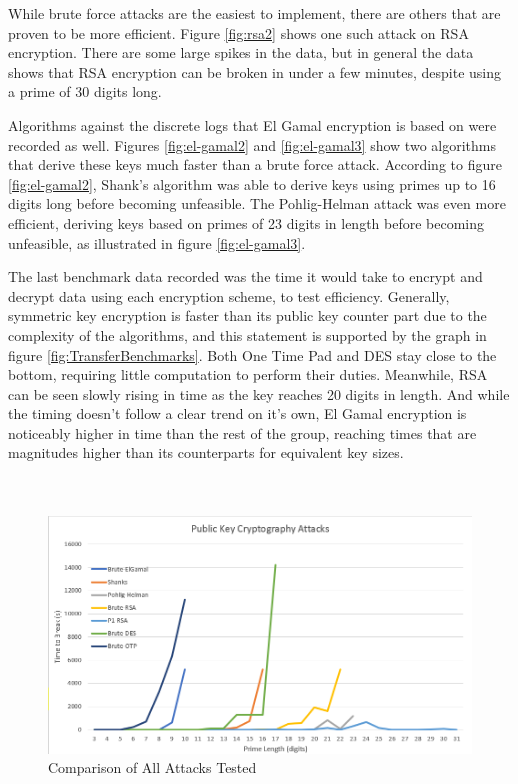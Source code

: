 \documentclass[12pt]{report}
\begin{document}
While brute force attacks are the easiest to implement, there are others that are proven to be more efficient. Figure \ref{fig:rsa2} shows one such attack on RSA encryption.
There are some large spikes in the data, but in general the data shows that RSA encryption can be broken in under a few minutes, despite using a prime of 30 digits long.

Algorithms against the discrete logs that El Gamal encryption is based on were recorded as well. Figures \ref{fig:el-gamal2} and \ref{fig:el-gamal3} show two algorithms
that derive these keys much faster than a brute force attack. According to figure \ref{fig:el-gamal2}, Shank's algorithm was able to derive keys using primes up to 16
digits long before becoming unfeasible. The Pohlig-Helman attack was even more efficient, deriving keys based on primes of 23 digits in length before becoming unfeasible,
as illustrated in figure \ref{fig:el-gamal3}.

The last benchmark data recorded was the time it would take to encrypt and decrypt data using each encryption scheme, to test efficiency. Generally, symmetric key encryption
is faster than its public key counter part due to the complexity of the algorithms, and this statement is supported by the graph in figure \ref{fig:TransferBenchmarks}. Both
One Time Pad and DES stay close to the bottom, requiring little computation to perform their duties. Meanwhile, RSA can be seen slowly rising in time as the key reaches 20
digits in length. And while the timing doesn't follow a clear trend on it's own, El Gamal encryption is noticeably higher in time than the rest of the group, reaching times
that are magnitudes higher than its counterparts for equivalent key sizes.
\\
\\
\\

\begin{figure}[hp!] %
    \begin{center}
        \includegraphics[width=0.85\linewidth]{Pictures/AllAttack.PNG}
        \caption{Comparison of All Attacks Tested}
        \label{fig:allattack}
    \end{center}
\end{figure}
\end{document}
